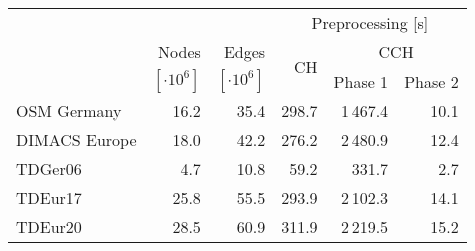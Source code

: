 \begin{tabular}{lrrrrr}
\toprule
 &                &                & \multicolumn{3}{c}{Preprocessing [s]} \\ \cmidrule(lr){4-6} & Nodes          & Edges          & \multirow{2}{*}{CH} & \multicolumn{2}{c}{CCH} \\ \cmidrule(lr){5-6} & $[\cdot 10^6]$ & $[\cdot 10^6]$ &                     & Phase 1 & Phase 2 \\
\midrule
OSM Germany   &       16.2 &       35.4 &                          298.7 &        1\,467.4 &          10.1 \\
DIMACS Europe &       18.0 &       42.2 &                          276.2 &        2\,480.9 &          12.4 \\
TDGer06       &        4.7 &       10.8 &                           59.2 &         331.7 &           2.7 \\
TDEur17       &       25.8 &       55.5 &                          293.9 &        2\,102.3 &          14.1 \\
TDEur20       &       28.5 &       60.9 &                          311.9 &        2\,219.5 &          15.2 \\
\bottomrule
\end{tabular}

